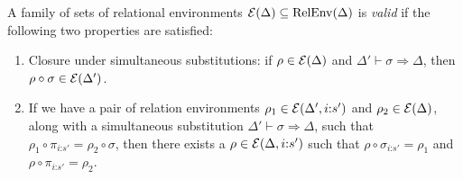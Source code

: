 \begin{definition}
  \label{defn:valid-rel-env-family}
  A family of sets of relational environments $\mathcal{E}(\Delta)
  \subseteq \mathrm{RelEnv}(\Delta)$ is \emph{valid} if the following
  two properties are satisfied:
  \begin{enumerate}
  \item Closure under simultaneous substitutions: if $\rho \in
    \mathcal{E}(\Delta)$ and $\Delta' \vdash \sigma \Rightarrow \Delta$,
    then $\rho \circ \sigma \in \mathcal{E}(\Delta')$.
  \item If we have a pair of relation environments $\rho_1 \in
    \mathcal{E}(\Delta', i\mathord:s')$ and $\rho_2 \in
    \mathcal{E}(\Delta)$, along with a simultaneous substitution
    $\Delta' \vdash \sigma \Rightarrow \Delta$, such that $\rho_1
    \circ \pi_{i\mathord:s'} = \rho_2 \circ \sigma$, then there exists
    a $\rho \in \mathcal{E}(\Delta, i\mathord:s')$ such that $\rho
    \circ \sigma_{i\mathord:s'} = \rho_1$ and $\rho \circ
    \pi_{i\mathord:s'} = \rho_2$.
  \end{enumerate}
\end{definition}

